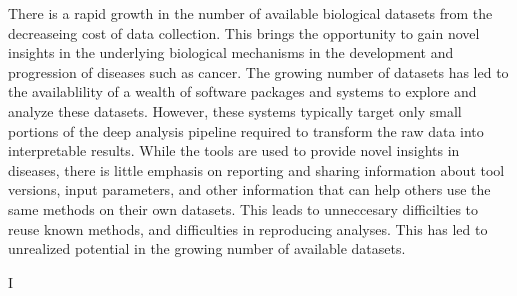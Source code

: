 % 

There is a rapid growth in the number of available biological datasets from the
decreaseing cost of data collection. This brings the opportunity to gain novel
insights in the underlying biological mechanisms in the development and
progression of diseases such as cancer. The growing number of datasets has led
to the availablility of a wealth of software packages and systems to explore and
analyze these datasets. However, these systems typically target only small
portions of the deep analysis pipeline required to transform the raw data into
interpretable results. While the tools are used to provide novel insights in
diseases, there is little emphasis on reporting and sharing information about
tool versions, input parameters, and other information that can help others use
the same methods on their own datasets. This leads to unneccesary difficilties
to reuse known methods, and difficulties in reproducing analyses.  This has led
to unrealized potential in the growing number of available datasets. 




\begin{enumerate*}[label=(\roman*)]
    \item I
\end{enumerate*} 



